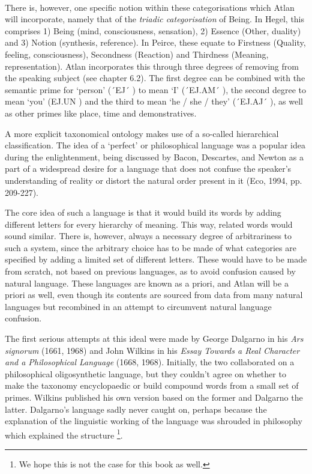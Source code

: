 \phantom{.}\\

There is, however, one specific notion within these categorisations which Atlan will incorporate, namely that of the {\it triadic categorisation} of Being. In Hegel, this comprises 1) Being (mind, consciousness, sensation), 2) Essence (Other, duality) and 3) Notion (synthesis, reference). In Peirce, these equate to Firstness (Quality, feeling, consciousness), Secondness (Reaction) and Thirdness (Meaning, representation). Atlan incorporates this through three degrees of removing from the speaking subject (see chapter 6.2). The first degree can be combined with the semantic prime for ‘person’ (´EJ´ \ej) to mean ‘I’ (´EJ.AM´ \ej \am), the second degree to mean ‘you’ (EJ.UN \ej \un) and the third to mean ‘he / she / they’ (´EJ.AJ´ \ej \aj), as well as other primes like place, time and demonstratives. 

\vspace{-0.1cm}
A more explicit taxonomical ontology makes use of a so-called hierarchical classification. The idea of a ‘perfect’ or philosophical language was a popular idea during the enlightenment, being discussed by Bacon, Descartes, and Newton as a part of a widespread desire for a language that does not confuse the speaker’s understanding of reality or distort the natural order present in it (Eco, 1994, pp. 209-227). 

The core idea of such a language is that it would build its words by adding different letters for every hierarchy of meaning. This way, related words would sound similar. There is, however, always a necessary degree of arbitrariness to such a system, since the arbitrary choice has to be made of what categories are specified by adding a limited set of different letters. These would have to be made from scratch, not based on previous languages, as to avoid confusion caused by natural language. These languages are known as a priori, and Atlan will be a priori as well, even though its contents are sourced from data from many natural languages but recombined in an attempt to circumvent natural language confusion.  

The first serious attempts at this ideal were made by George Dalgarno in his {\it Ars signorum} (1661, 1968) and John Wilkins in his \textit{Essay Towards a Real Character and a Philosophical Language} (1668, 1968). Initially, the two collaborated on a philosophical oligosynthetic language, but they couldn’t agree on whether to make the taxonomy encyclopaedic or build compound  words from a small set of primes. Wilkins published his own version based on the former and Dalgarno the latter. Dalgarno’s language sadly never caught on, perhaps because the explanation of the linguistic working of the language was shrouded in philosophy which explained the structure \footnote{We hope this is not the case for this book as well.}. 

